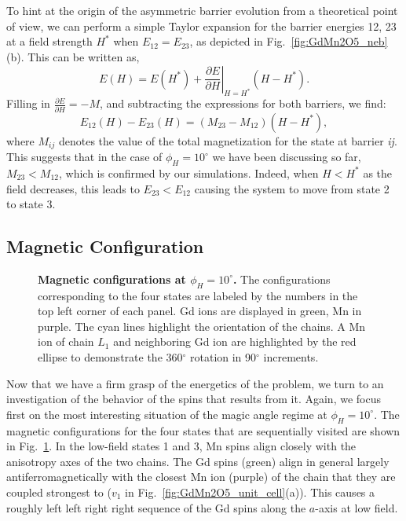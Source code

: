 \\\\
%
To hint at the origin of the asymmetric barrier evolution from a theoretical point of view, we can perform a simple Taylor expansion for the barrier energies 12, 23 at a field strength $H^*$ when $E_{12} = E_{23}$, as depicted in Fig.~\ref{fig:GdMn2O5_neb}(b).
This can be written as,
\begin{equation}
	E(H) = E(H^*) + \left.\frac{\partial E}{\partial H}\right|_{H=H^*}(H - H^*).
\end{equation}
Filling in $\frac{\partial E}{\partial H} = -M$, and subtracting the expressions for both barriers, we find:
\begin{equation}
	E_{12}(H) - E_{23}(H) = (M_{23} - M_{12})(H - H^*),
\end{equation}
where $M_{ij}$ denotes the value of the total magnetization for the state at barrier {\it ij}.
This suggests that in the case of $\phi_H=10^\circ$ we have been discussing so far, $M_{23} < M_{12}$, which is confirmed by our simulations.
Indeed, when $H<H^*$ as the field decreases, this leads to $E_{23} < E_{12}$ causing the system to move from state 2 to state 3.

\subsection{Magnetic Configuration \label{sec:GdMn2O5_magnetic_configuration}}
\begin{figure}[h!]
    \centering
    \caption{\label{fig:GdMn2O5_spin_configs}{\bf Magnetic configurations at $\phi_H =  10^\circ$.} The configurations corresponding to the four states are labeled by the numbers in the top left corner of each panel. Gd ions are displayed in green, Mn in purple. The cyan lines highlight the orientation of the chains. A Mn ion of chain $L_1$ and neighboring Gd ion are highlighted by the red ellipse to demonstrate the 360$^\circ$ rotation in 90$^\circ$ increments.  }
    \label{fig:GdMn2O5_4configs}
\end{figure}
Now that we have a firm grasp of the energetics of the problem, we turn to an investigation of the behavior of the spins that results from it.
Again, we focus first on the most interesting situation of the magic angle regime at $\phi_H=10^\circ$.
The magnetic configurations for the four states that are sequentially visited are shown in Fig.~\ref{fig:GdMn2O5_4configs}.
In the low-field states 1 and 3, Mn spins align closely with the anisotropy axes of the two chains.
The Gd spins (green) align in general largely antiferromagnetically with the closest Mn ion (purple) of the chain that they are coupled strongest to ($v_1$ in Fig.~\ref{fig:GdMn2O5_unit_cell}(a)).
This causes a roughly left left right right sequence of the Gd spins along the $a$-axis at low field. 

